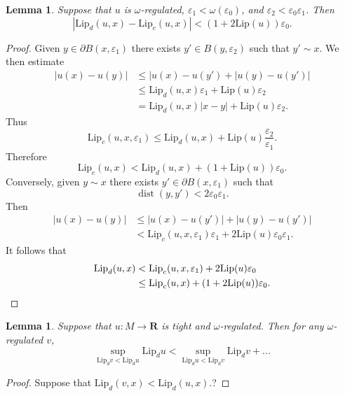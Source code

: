 \documentclass[reqno,11pt]{amsart}
\newcommand{\RR}{\mathbf{R}}
\DeclareMathOperator{\dist}{dist}
\newcommand{\Lip}{\mathrm{Lip}}
\newtheorem{lemma}[theorem]{Lemma}
\theoremstyle{definition}
\numberwithin{equation}{section}
\begin{document}
\begin{lemma}
Suppose that $u$ is $\omega$-regulated, $\varepsilon_1 < \omega(\varepsilon_0)$, and $\varepsilon_2 < \varepsilon_0 \varepsilon_1$.
Then 
$$|\Lip_d(u, x) - \Lip_c(u, x)| < (1 + 2 \Lip(u)) \varepsilon_0.$$
\end{lemma}
\begin{proof}
Given $y \in \partial B(x, \varepsilon_1)$ there exists $y' \in B(y, \varepsilon_2)$ such that $y' \sim x$.
We then estimate 
\begin{align*}
|u(x) - u(y)|
&\leq |u(x) - u(y') + |u(y) - u(y')| \\
&\leq \Lip_d(u, x) \varepsilon_1 + \Lip(u) \varepsilon_2 \\
&= \Lip_d(u, x) |x - y| + \Lip(u) \varepsilon_2.
\end{align*}
Thus 
$$\Lip_c(u, x, \varepsilon_1) \leq \Lip_d(u, x) + \Lip(u) \frac{\varepsilon_2}{\varepsilon_1}.$$
Therefore
$$\Lip_c(u, x) < \Lip_d(u, x) + (1 + \Lip(u)) \varepsilon_0.$$
Conversely, given $y \sim x$ there exists $y' \in \partial B(x, \varepsilon_1)$ such that
$$\dist(y, y') < 2\varepsilon_0\varepsilon_1.$$
Then 
\begin{align*}
|u(x) - u(y)| 
&\leq |u(x) - u(y')| + |u(y) - u(y')| \\
&< \Lip_c(u, x, \varepsilon_1) \varepsilon_1 + 2\Lip(u) \varepsilon_0 \varepsilon_1.
\end{align*}
It follows that 
\begin{align*}
\Lip_d(u, x) 
&< \Lip_c(u, x, \varepsilon_1) + 2\Lip(u) \varepsilon_0 \\
&\leq \Lip_c(u, x) + (1 + 2 \Lip(u)) \varepsilon_0. \qedhere 
\end{align*}
\end{proof}

\begin{lemma}
Suppose that $u: M \to \RR$ is tight and $\omega$-regulated.
Then for any $\omega$-regulated $v$,
$$\sup_{\Lip_d v < \Lip_d u} \Lip_d u < \sup_{\Lip_d u < \Lip_d v} \Lip_d v + ...$$
\end{lemma}
\begin{proof}
Suppose that $\Lip_d(v, x) < \Lip_d(u, x)$.?
\end{proof}



\printbibliography
\end{document}
